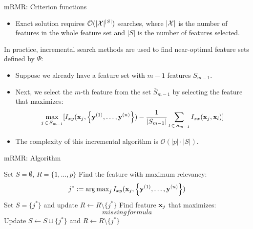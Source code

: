 \documentclass[11pt,compress,t,notes=noshow, xcolor=table]{beamer}
\begin{document}
\begin{vbframe}{\MakeLowercase{M}RMR: Criterion functions}
\begin{itemize}
  \item Exact solution requires $ \mathcal{O} (|\mathcal{X}|^{|S|})$ searches, where $|\mathcal{X}|$ is the number of features in the whole feature set and $|S|$ is the number of features selected.
  \end{itemize}
  In practice, incremental search methods are used to find near-optimal feature sets defined by $\Psi$:
  \begin{itemize}
  \item Suppose we already have a feature set with $m-1$ features $S_{m-1}$.
  \item Next, we select the $m$-th feature from the set $\bar{S}_{m-1}$ by selecting the feature that maximizes:
  $$\max_{j \, \in \, \bar{S}_{m-1}} [ I_{xy} (\mathbf{x}_j, \left\{ \mathbf{y}^{(1)}, \ldots, \mathbf{y}^{(n)}\right\}) - \frac{1}{|S_{m-1}|} \sum_{l \, \in \, S_{m-1}} I_{xx}(\mathbf{x}_j, \mathbf{x}_l)  ]$$
  \item The complexity of this incremental algorithm is $\mathcal{O}(|p| \cdot| S|)$.
  \end{itemize}
  \end{vbframe}

  \begin{vbframe}{\MakeLowercase{m}RMR: Algorithm}

  \begin{algorithm}[H]
  \footnotesize
    \begin{algorithmic}[1]
      \State Set $S = \emptyset$, $R = \{ 1, \dots, p \}$
      \State Find the feature with maximum relevancy:
      $$j^* := \operatorname{arg\,max}_{j} I_{xy} (\mathbf{x}_j, \left\{ \mathbf{y}^{(1)}, \ldots, \mathbf{y}^{(n)}\right\})$$
      \State Set $S = \{ j^* \}$ and update $R \leftarrow R \setminus \{j^* \}$
      \Repeat
        \State Find feature $\mathbf{x}_j$ that maximizes:
        $$missing formula$$%
        \State Update $S \leftarrow S \cup \{j^* \}$ and $R \leftarrow R \setminus \{ j^* \}$
      \caption{mRMR algorithm}
    \end{algorithmic}
  \end{algorithm}
  \end{vbframe}


  
  
\end{document}
